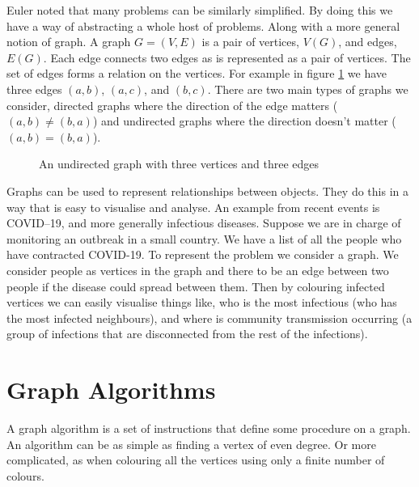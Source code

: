 Euler noted that many problems can be similarly simplified. By doing this we have a way of abstracting a whole host of problems. Along with a more general notion of graph. A graph $G=(V,E)$ is a pair of vertices, $V(G)$, and edges, $E(G)$. Each edge connects two edges as is represented as a pair of vertices. The set of edges forms a relation on the vertices. For example in figure \ref{fig:k3} we have three edges $(a,b)$, $(a,c)$, and $(b,c)$. There are two main types of graphs we consider, directed graphs where the direction of the edge matters ($(a,b)\neq (b,a)$) and undirected graphs where the direction doesn't matter ($(a,b)=(b,a)$). 

\begin{figure}[h]
    \centering
{}
    \caption{An undirected graph with three vertices and three edges}
\label{fig:k3}
\end{figure}
   
Graphs can be used to represent relationships between objects. They do this in a way that is easy to visualise and analyse. An example from recent events is COVID--19, and more generally infectious diseases.  Suppose we are in charge of monitoring an outbreak in a small country. We have a list of all the people who have contracted COVID-19. To represent the problem we consider a graph. We consider people as vertices in the graph and there to be an edge between two people if the disease could spread between them.
Then by colouring infected vertices we can easily visualise things like, who is the most infectious (who has the most infected neighbours), and where is community transmission occurring (a group of infections that are disconnected from the rest of the infections).
  
\section{Graph Algorithms}
A graph algorithm is a set of instructions that define some procedure on a graph. An algorithm can be as simple as finding a vertex of even degree. Or more complicated, as when colouring all the vertices using only a finite number of colours.  


